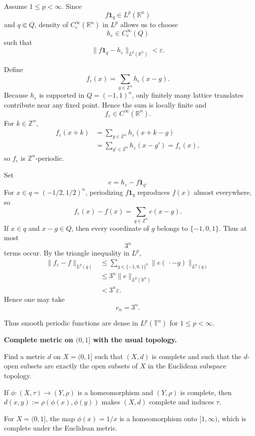 \begin{solution}
Assume \(1\le p<\infty\). Since
\[
f\mathbf1_q\in L^p(\mathbb R^n)
\]
and \(q\Subset Q\), density of \(C_c^\infty(\mathbb R^n)\) in \(L^p\) allows us to choose
\[
h_\varepsilon\in C_c^\infty(Q)
\]
such that
\[
\|f\mathbf1_q-h_\varepsilon\|_{L^p(\mathbb R^n)}
<
\varepsilon.
\]

Define
\[
f_\varepsilon(x)
=
\sum_{g\in\mathbb Z^n}h_\varepsilon(x-g).
\]
Because \(h_\varepsilon\) is supported in \(Q=(-1,1)^n\), only finitely many lattice translates contribute near any fixed point. Hence the sum is locally finite and
\[
f_\varepsilon\in C^\infty(\mathbb R^n).
\]
For \(k\in\mathbb Z^n\),
\[
\begin{aligned}
f_\varepsilon(x+k)
&=
\sum_{g\in\mathbb Z^n}h_\varepsilon(x+k-g)\\
&=
\sum_{g'\in\mathbb Z^n}h_\varepsilon(x-g')
=
f_\varepsilon(x),
\end{aligned}
\]
so \(f_\varepsilon\) is \(\mathbb Z^n\)-periodic.

Set
\[
e=h_\varepsilon-f\mathbf1_q.
\]
For \(x\in q=(-1/2,1/2)^n\), periodizing \(f\mathbf1_q\) reproduces \(f(x)\) almost everywhere, so
\[
f_\varepsilon(x)-f(x)
=
\sum_{g\in\mathbb Z^n}e(x-g).
\]
If \(x\in q\) and \(x-g\in Q\), then every coordinate of \(g\) belongs to \(\{-1,0,1\}\). Thus at most
\[
3^n
\]
terms occur. By the triangle inequality in \(L^p\),
\[
\begin{aligned}
\|f_\varepsilon-f\|_{L^p(q)}
&\le
\sum_{g\in\{-1,0,1\}^n}
\|e(\,\cdot-g)\|_{L^p(q)}\\
&\le
3^n\|e\|_{L^p(\mathbb R^n)}\\
&<
3^n\varepsilon.
\end{aligned}
\]
Hence one may take
\[
\boxed{c_n=3^n}.
\]

Thus smooth periodic functions are dense in \(L^p(\mathbb T^n)\) for \(1\le p<\infty\).
\end{solution}


\begin{problem}[CP-II-0030]
\label{prob:cp-ii-0030}
\textbf{Complete metric on $(0,1]$ with the usual topology.}

\hspace*{1.5em}Find a metric \(d\) on \(X=(0,1]\) such that \((X,d)\) is complete and such that the \(d\)-open subsets
are exactly the open subsets of \(X\) in the Euclidean subspace topology.

\smallskip

If \(\phi:(X,\tau)\to(Y,\rho)\) is a homeomorphism and \((Y,\rho)\) is complete, then
\(d(x,y):=\rho(\phi(x),\phi(y))\) makes \((X,d)\) complete and induces \(\tau\).

For \(X=(0,1]\), the map \(\phi(x)=1/x\) is a homeomorphism onto \([1,\infty)\),
which is complete under the Euclidean metric.

\smallskip
\end{problem}

